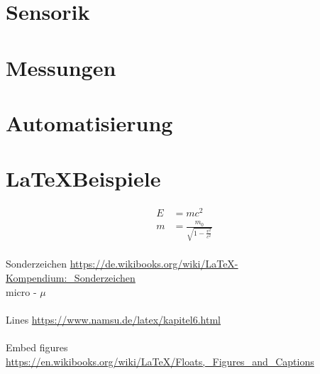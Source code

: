 \documentclass[11pt]{scrartcl}
\begin{document}
\section{Sensorik}
\clearpage

\section{Messungen}
\clearpage

\section{Automatisierung}
\clearpage


\section{\LaTeX Beispiele}
\begin{align}
E &= mc^2                 \\
m &= \frac{m_0}{\sqrt{1-\frac{v^2}{c^2}}}
\end{align}
\\
Sonderzeichen
\url{https://de.wikibooks.org/wiki/LaTeX-Kompendium:_Sonderzeichen}\\
micro - $\mu$\\
\\
Lines
\url{https://www.namsu.de/latex/kapitel6.html}\\
\\
Embed figures
\url{https://en.wikibooks.org/wiki/LaTeX/Floats,_Figures_and_Captions}
\clearpage
\end{document}
